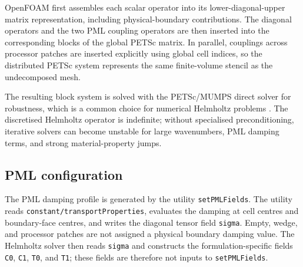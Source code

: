 \documentclass[final,num,12pt]{elsarticle}
\begin{document}
OpenFOAM first assembles each scalar operator into its lower-diagonal-upper
matrix representation, including physical-boundary contributions.  The
diagonal operators and the two PML coupling operators are then inserted into
the corresponding blocks of the global PETSc matrix.  In parallel, couplings
across processor patches are inserted explicitly using global cell indices, so
the distributed PETSc system represents the same finite-volume stencil as the
undecomposed mesh.  

The resulting block system is solved with the PETSc/MUMPS direct solver for
robustness, which is a common choice for numerical Helmholtz problems
\cite{lesnik2023cavitat}.  The discretised Helmholtz operator is indefinite;
without specialised preconditioning, iterative solvers can become unstable for
large wavenumbers, PML damping terms, and strong material-property jumps.

\subsection{PML configuration}
The PML damping profile is generated by the utility \texttt{setPMLFields}.  The
utility reads \texttt{constant/transportProperties}, evaluates the damping at
cell centres and boundary-face centres, and writes the diagonal tensor field
\texttt{sigma}.  Empty, wedge, and processor patches are not assigned a physical
boundary damping value.  The Helmholtz solver then reads \texttt{sigma} and
constructs the formulation-specific fields \texttt{C0}, \texttt{C1},
\texttt{T0}, and \texttt{T1}; these fields are therefore not inputs to
\texttt{setPMLFields}.
\end{document}
